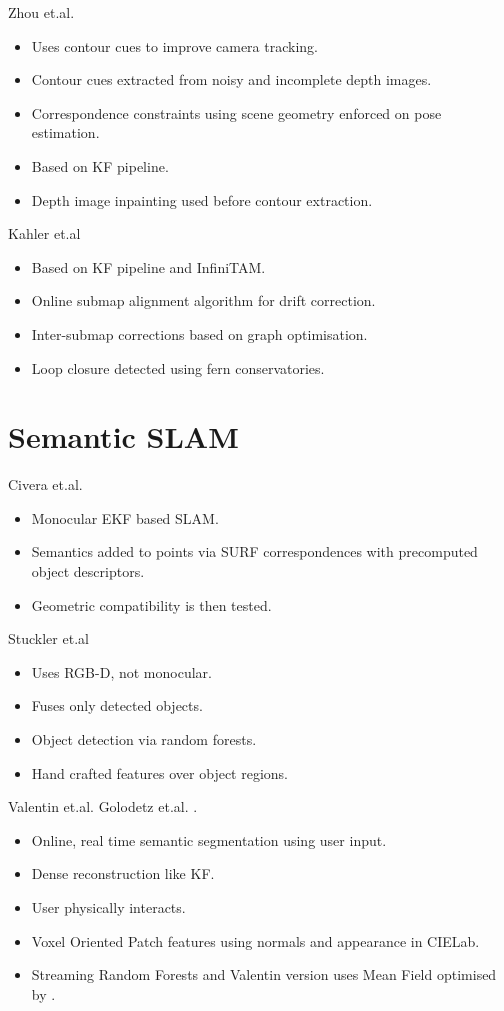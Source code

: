 Zhou et.al. \cite{Zhou2015}
\begin{itemize}
	\item Uses contour cues to improve camera tracking.
	\item Contour cues extracted from noisy and incomplete depth images.
	\item Correspondence constraints using scene geometry enforced on pose estimation.
	\item Based on KF pipeline.
	\item Depth image inpainting used before contour extraction.
\end{itemize}

Kahler et.al \cite{Kahler2016} 
\begin{itemize}
	\item Based on KF pipeline and InfiniTAM.
	\item Online submap alignment algorithm for drift correction.
	\item Inter-submap corrections based on graph optimisation.
	\item Loop closure detected using fern conservatories. %
\end{itemize}

\section{Semantic SLAM}
\label{sec:lit_review_semantic}
Civera et.al. \cite{Civera2011}
\begin{itemize}
	\item Monocular EKF based SLAM.
	\item Semantics added to points via SURF correspondences with precomputed object descriptors.
	\item Geometric compatibility is then tested.
\end{itemize}

Stuckler et.al \cite{Stuckler2012} 
\begin{itemize}
	\item Uses RGB-D, not monocular.
	\item Fuses only detected objects.
	\item Object detection via random forests.
	\item Hand crafted features over object regions.
\end{itemize}

Valentin et.al. \cite{Valentin2015} Golodetz et.al. \cite{Golodetz2015}.
\begin{itemize}
	\item Online, real time semantic segmentation using user input.
	\item Dense reconstruction like KF.
	\item User physically interacts.
	\item Voxel Oriented Patch features using normals and appearance in CIELab.
	\item Streaming Random Forests\cite{Abdulsalam2007}  and Valentin version uses Mean Field \cite{Xing2002} optimised by \cite{Krahenbuhl2011}.
\end{itemize}


